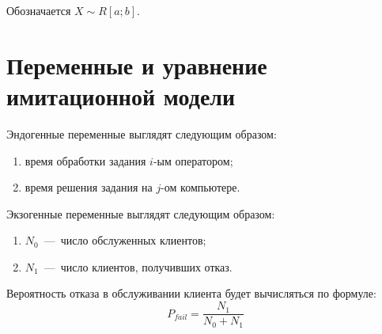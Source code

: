 Обозначается $X \sim R[a; b]$.

\clearpage

\section{Переменные и уравнение имитационной модели}

Эндогенные переменные выглядят следующим образом:
\begin{enumerate}
	\item время обработки задания $i$-ым оператором;
	\item время решения задания на $j$-ом компьютере.
\end{enumerate}

Экзогенные переменные выглядят следующим образом:
\begin{enumerate}
	\item $N_{0}$~---~число обслуженных клиентов;
	\item $N_{1}$~---~число клиентов, получивших отказ.
\end{enumerate}

Вероятность отказа в обслуживании клиента будет вычисляться по формуле:
\begin{equation}
	P_{fail} = \frac{N_{1}}{N_{0} + N_{1}}
\end{equation}

